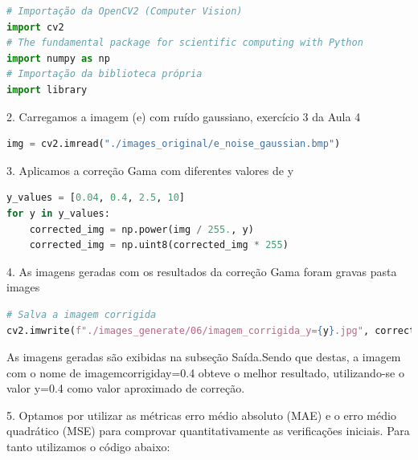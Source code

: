 \documentclass[10pt,a4paper]{article}
\begin{document}
\begin{lstlisting}[language=Python]
# Importação da OpenCV2 (Computer Vision)
import cv2
# The fundamental package for scientific computing with Python
import numpy as np
# Importação da biblioteca própria
import library
\end{lstlisting}

\begin{flushleft}
2.	Carregamos a imagem (e) com ruído gaussiano, exercício 3 da Aula 4
\end{flushleft}

\begin{lstlisting}[language=Python]
img = cv2.imread("./images_original/e_noise_gaussian.bmp")
\end{lstlisting}

\begin{flushleft}
3.	Aplicamos a correção Gama com diferentes valores de y
\end{flushleft}

\begin{lstlisting}[language=Python]
y_values = [0.04, 0.4, 2.5, 10]
for y in y_values:
    corrected_img = np.power(img / 255., y)
    corrected_img = np.uint8(corrected_img * 255)
\end{lstlisting}

\begin{flushleft}
4.	As imagens geradas com os resultados da correção Gama foram gravas pasta images
\end{flushleft}

\begin{lstlisting}[language=Python]
# Salva a imagem corrigida
cv2.imwrite(f"./images_generate/06/imagem_corrigida_y={y}.jpg", corrected_img)  
\end{lstlisting}

\begin{flushleft}
As imagens geradas são exibidas na subseção Saída.Sendo que destas, a imagem com o nome de imagem\textunderscore corrigida\textunderscore y=0.4 obteve o melhor resultado,  utilizando-se  o valor y=0.4 como valor aproximado de correção.
\end{flushleft}

\begin{flushleft}
5. Optamos por utilizar as métricas erro médio absoluto (MAE) e o erro médio quadrático (MSE) para comprovar quantitativamente as verificações iniciais. Para tanto utilizamos o código abaixo:
\end{flushleft}
\end{document}
